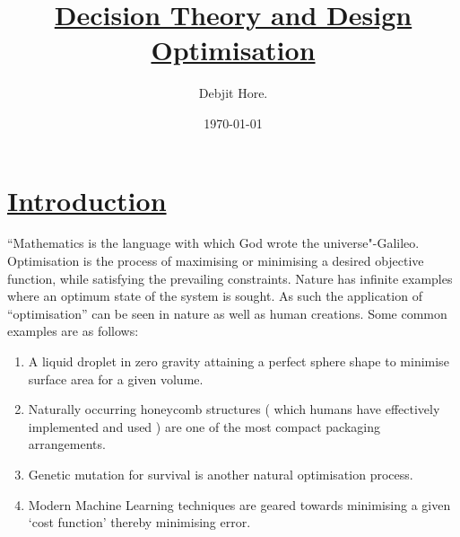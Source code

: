 \documentclass[12pt,a4paper,titlepage]{article}
\title{\Huge \underline{ Decision Theory and Design Optimisation}}
\author{Debjit Hore.}
\date{\today}
\begin{document}
\maketitle
\mbox{}
\printnomenclature

\clearpage
\tableofcontents

\clearpage
\section{\underline{Introduction}}
``Mathematics is the language with which God wrote the universe"-Galileo.\\[1\baselineskip]
Optimisation is the process of maximising or minimising a desired objective function, while satisfying the prevailing constraints. Nature has infinite examples where an optimum state of the system is sought. As such the application of ``optimisation'' can be seen in nature as well as human creations. Some common examples are as follows:
{\begin{enumerate}
    \item A liquid droplet in zero gravity attaining a perfect sphere shape to minimise surface area for a given volume.
    \item Naturally occurring honeycomb structures ( which humans have effectively implemented and used ) are one of the most compact packaging arrangements.\
    \item Genetic mutation for survival is another natural optimisation process.
    \item Modern Machine Learning techniques are geared towards minimising a given `cost function' thereby minimising error.
\end{enumerate}}
\end{document}
